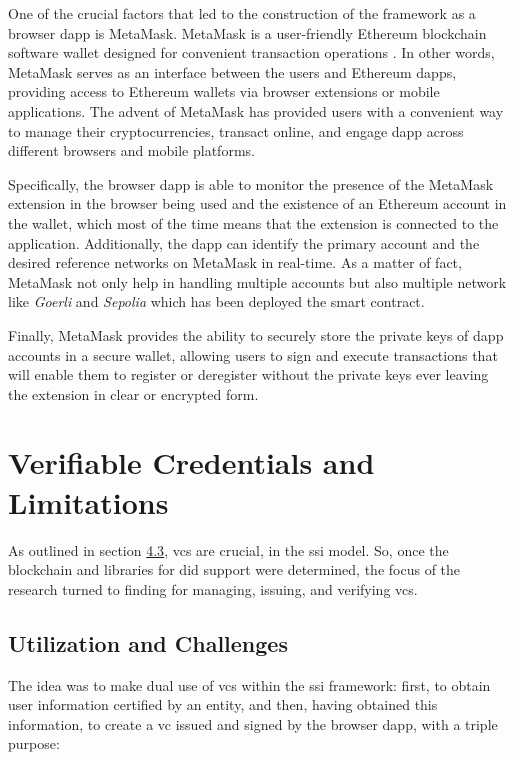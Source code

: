 One of the crucial factors that led to the construction of the framework as a browser \gls{dapp} is MetaMask. MetaMask is a user-friendly Ethereum blockchain software 
wallet designed for convenient transaction operations \cite{metamask}. In other words, MetaMask serves as an interface between the users and Ethereum \gls{dapp}s, providing access to Ethereum 
wallets via browser extensions or mobile applications. The advent of MetaMask has provided users with a convenient way to manage their cryptocurrencies, transact online, 
and engage \gls{dapp} across different browsers and mobile platforms. 

Specifically, the browser \gls{dapp} is able to monitor the presence of the MetaMask extension in the browser being used and the existence of an Ethereum 
account in the wallet, which most of the time means that the extension is connected to the application. Additionally, the \gls{dapp} can identify the primary account and the 
desired reference networks on MetaMask in real-time. As a matter of fact, MetaMask not only help in handling multiple accounts but also multiple network like \textit{Goerli} and 
\textit{Sepolia} which has been deployed the smart contract.

Finally, MetaMask provides the ability to securely store the private keys of \gls{dapp} accounts in a secure wallet, allowing users to sign and execute transactions that will 
enable them to register or deregister without the private keys ever leaving the extension in clear or encrypted form.



\section{Verifiable Credentials and Limitations} \label{sec:6.3}

As outlined in section \hyperref[sec:4.3]{4.3}, \gls{vc}s are crucial, in the \gls{ssi} model. So, once the blockchain and libraries for \gls{did} support were determined, the focus of the 
research turned to finding for managing, issuing, and verifying \gls{vc}s.

\subsection{Utilization and Challenges}

The idea was to make dual use of \gls{vc}s within the \gls{ssi} framework: first, to obtain user information certified by an entity, and then, having obtained this information, to 
create a \gls{vc} issued and signed by the browser \gls{dapp}, with a triple purpose:

